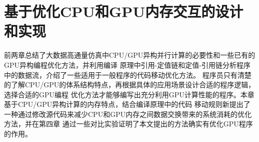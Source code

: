 \chapter{基于优化CPU和GPU内存交互的设计和实现}
前两章总结了大数据高通量仿真中CPU/GPU异构并行计算的必要性和一些已有的GPU异构编程优化方法，并利用编译
原理中引用-定值链和定值-引用链分析程序中的数据流，介绍了一些适用于一般程序的代码移动优化方法。
程序员只有清楚的了解CPU/GPU的体系结构特点，再根据具体的应用场景设计合适的程序逻辑，选择合适的GPU编程
优化方法才能够编写出充分利用GPU计算性能的程序。本章基于CPU/GPU异构计算的内存特点，结合编译原理中的代码
移动规则新提出了一种通过修改源代码来减少CPU和GPU内存之间数据交换带来的系统消耗的优化方法，并在第四章
通过一些对比实验证明了本文提出的方法确实有优化GPU程序的作用。